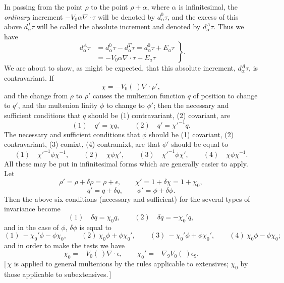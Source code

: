 \documentclass[11pt]{article}
\begin{document}
\indent In passing from the point $\rho$ to the point $\rho+\alpha$, where $\alpha$ is infinitesimal, the
\emph{ordinary} increment $-V_0\alpha\nabla\cdot\tau$ will be denoted by $d_\alpha^0\tau$, and the excess of this above $d_\alpha^T\tau$ will be called the absolute increment and denoted by $d_\alpha^A\tau$. Thus we have
\begin{equation}\left.\begin{aligned}
d_\alpha^A\tau&=d_\alpha^0\tau-d_\alpha^T\tau=d_\alpha^0\tau+E_a\tau\\
&=-V_0\alpha\nabla\cdot\tau+E_a\tau
\end{aligned}\right\}.\tag{1}\end{equation}
We are about to show, as might be expected, that this absolute increment, $d_\alpha^A\tau$, is contravariant. If
\begin{equation}\chi=-V_0(\ )\nabla\cdot\rho',\tag{2}\end{equation}
and the change from $\rho$ to $\rho'$ causes the multenion function $q$ of position to change to $q'$, and the multenion linity $\phi$ to change to $\phi'$; then the necessary and sufficient conditions that $q$ should be (1) contravariant, (2) covariant, are
\[
(1)\quad q'=\chi q,\qquad (2)\quad q'=\chi'^{-1}q.
\]
The necessary and sufficient conditions that $\phi$ should be (1) covariant, (2) contravariant, (3) comixt, (4) contramixt, are that $\phi'$ should be equal to
\[
(1)\quad\chi'^{-1}\phi\chi^{-1},\qquad (2)\quad\chi\phi\chi',\qquad (3)\quad\chi'^{-1}\phi\chi',\qquad (4)\quad\chi\phi\chi^{-1}.
\]
All these may be put in infinitesimal forms which are generally easier to apply. Let
\[
\rho'=\rho+\delta\rho=\rho+\epsilon,\qquad \chi'=1+\delta\chi=1+\chi_0,
\]
\[
q'=q+\delta q,\qquad \phi'=\phi+\delta\phi.
\]
Then the above six conditions (necessary and sufficient) for the several types of invariance become
\[
(1)\quad\delta q=\chi_0q,\qquad (2)\quad\delta q=-\chi_0'q,
\]
and in the case of $\phi$, $\delta\phi$ is equal to
\[
(1)\ -\chi_0'\phi-\phi\chi_0,\qquad (2)\ \chi_0\phi+\phi\chi_0',\qquad (3)\ -\chi_0'\phi+\phi\chi_0',\qquad (4)\ \chi_0\phi-\phi\chi_0;
\]
and in order to make the tests we have
\begin{equation}\chi_0=-V_0(\ )\nabla\cdot\epsilon,\qquad \chi_0'=-\nabla_9V_0(\ )\epsilon_9.\tag{3}\end{equation}
[\,$\chi$ is applied to general multenions by the rules applicable to extensives; $\chi_0$ by those applicable to subextensives.\,]
\end{document}
